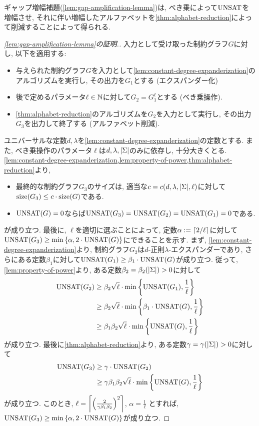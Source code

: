 ギャップ増幅補題(\cref{lem:gap-amplification-lemma})は, べき乗によって$\UNSAT$を増幅させ, それに伴い増幅したアルファベットを\cref{thm:alphabet-reduction}によって削減することによって得られる.

\begin{proof}[\cref{lem:gap-amplification-lemma}の証明.]
  入力として受け取った制約グラフ$G$に対し, 以下を適用する:
  
  \begin{itemize}
  \item 与えられた制約グラフ$G$を入力として\cref{lem:constant-degree-expanderization}のアルゴリズムを実行し, その出力を$G_1$とする (エクスパンダー化)
  \item 後で定めるパラメータ$\ell\in\Nat$に対して$G_2 = G_1^\ell$とする (べき乗操作).
  \item \cref{thm:alphabet-reduction}のアルゴリズムを$G_2$を入力として実行し, その出力$G_3$を出力して終了する (アルファベット削減).
  \end{itemize}

  ユニバーサルな定数$d,\lambda$を\cref{lem:constant-degree-expanderization}の定数とする.
  また, べき乗操作のパラメータ$\ell$は$d,\lambda,\abs{\Sigma}$のみに依存し, 十分大きくとる.
  \cref{lem:constant-degree-expanderization,lem:property-of-power,thm:alphabet-reduction}より,
  \begin{itemize}
    \item 最終的な制約グラフ$G_3$のサイズは, 適当な$c=c(d,\lambda,\abs{\Sigma},\ell)$に対して$\size(G_3) \le c \cdot \size(G)$である.
    \item $\UNSAT(G)=0$ならば$\UNSAT(G_3) = \UNSAT(G_2) = \UNSAT(G_1) = 0$である.
  \end{itemize}
  が成り立つ.
  最後に, $\ell$を適切に選ぶことによって, 定数$\alpha:=\ceil{2/\ell}$に対して$\UNSAT(G_3)\ge \min\qty{ \alpha, 2\cdot\UNSAT(G) }$にできることを示す.
  まず, \cref{lem:constant-degree-expanderization}より, 制約グラフ$G_2$は$d$-正則$\lambda$-エクスパンダーであり, さらにある定数$\beta_1$に対して$\UNSAT(G_1)\ge \beta_1\cdot \UNSAT(G)$が成り立つ.
  従って, \cref{lem:property-of-power}より, ある定数$\beta_2=\beta_2(\abs{\Sigma})>0$に対して
  \begin{align*}
    \UNSAT(G_2) &\ge \beta_2\sqrt{\ell}\cdot \min\qty{ \UNSAT(G_1), \frac{1}{\ell} } \\
    &\ge \beta_2\sqrt{\ell}\cdot \min\qty{ \beta_1\cdot \UNSAT(G), \frac{1}{\ell} } \\
    &\ge \beta_1\beta_2\sqrt{\ell}\cdot \min\qty{ \UNSAT(G), \frac{1}{\ell} } 
  \end{align*}
  が成り立つ. 最後に\cref{thm:alphabet-reduction}より, ある定数$\gamma=\gamma(\abs{\Sigma})>0$に対して
  \begin{align*}
    \UNSAT(G_3) &\ge \gamma\cdot \UNSAT(G_2) \\
    &\ge \gamma\beta_1\beta_2\sqrt{\ell}\cdot \min\qty{ \UNSAT(G), \frac{1}{\ell} }
  \end{align*}
  が成り立つ. このとき, $\ell = \ceil*{ \qty(\frac{2}{\gamma\beta_1\beta_2})^2 }$, $\alpha = \frac{1}{\ell}$
  とすれば, $\UNSAT(G_3)\ge \min\qty{ \alpha, 2\cdot\UNSAT(G) }$が成り立つ.

  \end{proof}

